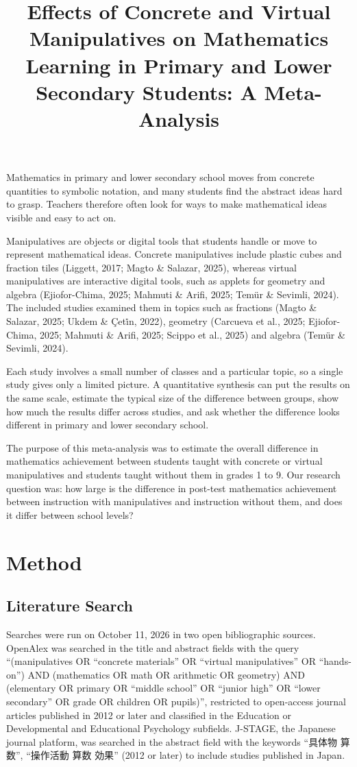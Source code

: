 \documentclass[man,a4paper,12pt,floatsintext,nolmodern,notab]{apa7}
\title{Effects of Concrete and Virtual Manipulatives on Mathematics Learning in Primary and Lower Secondary Students: A Meta-Analysis}
\begin{document}
\maketitle
Mathematics in primary and lower secondary school moves from concrete quantities to symbolic notation, and many students find the abstract ideas hard to grasp. Teachers therefore often look for ways to make mathematical ideas visible and easy to act on.

Manipulatives are objects or digital tools that students handle or move to represent mathematical ideas. Concrete manipulatives include plastic cubes and fraction tiles (Liggett, 2017; Magto \& Salazar, 2025), whereas virtual manipulatives are interactive digital tools, such as applets for geometry and algebra (Ejiofor-Chima, 2025; Mahmuti \& Arifi, 2025; Temür \& Sevimli, 2024). The included studies examined them in topics such as fractions (Magto \& Salazar, 2025; Ukdem \& Çeti̇n, 2022), geometry (Carcueva et al., 2025; Ejiofor-Chima, 2025; Mahmuti \& Arifi, 2025; Scippo et al., 2025) and algebra (Temür \& Sevimli, 2024).

Each study involves a small number of classes and a particular topic, so a single study gives only a limited picture. A quantitative synthesis can put the results on the same scale, estimate the typical size of the difference between groups, show how much the results differ across studies, and ask whether the difference looks different in primary and lower secondary school.

The purpose of this meta-analysis was to estimate the overall difference in mathematics achievement between students taught with concrete or virtual manipulatives and students taught without them in grades 1 to 9. Our research question was: how large is the difference in post-test mathematics achievement between instruction with manipulatives and instruction without them, and does it differ between school levels?

\section{Method}
\subsection{Literature Search}
Searches were run on October 11, 2026 in two open bibliographic sources. OpenAlex was searched in the title and abstract fields with the query “(manipulatives OR “concrete materials” OR “virtual manipulatives” OR “hands-on”) AND (mathematics OR math OR arithmetic OR geometry) AND (elementary OR primary OR “middle school” OR “junior high” OR “lower secondary” OR grade OR children OR pupils)”, restricted to open-access journal articles published in 2012 or later and classified in the Education or Developmental and Educational Psychology subfields. J-STAGE, the Japanese journal platform, was searched in the abstract field with the keywords “{\cjkfont 具体物} {\cjkfont 算数}”, “{\cjkfont 操作活動} {\cjkfont 算数} {\cjkfont 効果}” (2012 or later) to include studies published in Japan.
\end{document}
